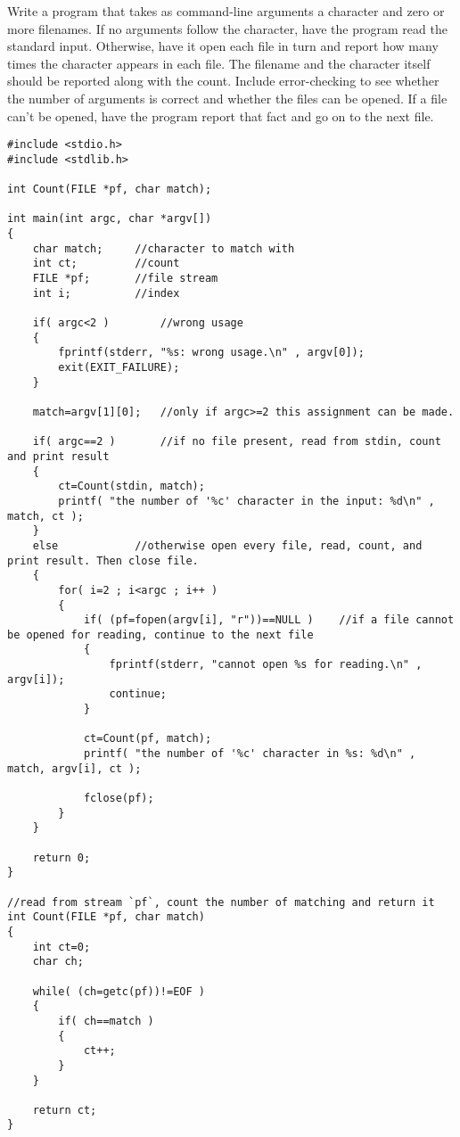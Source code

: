 \begin{question}
  Write a program that takes as command-line arguments a character and zero or more
  filenames. If no arguments follow the character, have the program read the standard
  input. Otherwise, have it open each file in turn and report how many times the character
  appears in each file. The filename and the character itself should be reported along with
  the count. Include error-checking to see whether the number of arguments is correct and
  whether the files can be opened. If a file can’t be opened, have the program report that
  fact and go on to the next file.
\end{question}
\begin{solution}
  \begin{verbatim}
#include <stdio.h>
#include <stdlib.h>

int Count(FILE *pf, char match);

int main(int argc, char *argv[])
{
	char match;		//character to match with
	int ct;			//count
	FILE *pf;		//file stream
	int i;			//index

	if( argc<2 )		//wrong usage
	{
		fprintf(stderr, "%s: wrong usage.\n" , argv[0]);
		exit(EXIT_FAILURE);
	}

	match=argv[1][0];	//only if argc>=2 this assignment can be made.

	if( argc==2 )		//if no file present, read from stdin, count and print result
	{
		ct=Count(stdin, match);
		printf( "the number of '%c' character in the input: %d\n" , match, ct );
	}
	else			//otherwise open every file, read, count, and print result. Then close file.
	{
		for( i=2 ; i<argc ; i++ )
		{
			if( (pf=fopen(argv[i], "r"))==NULL )	//if a file cannot be opened for reading, continue to the next file
			{
				fprintf(stderr, "cannot open %s for reading.\n" , argv[i]);
				continue;
			}

			ct=Count(pf, match);
			printf( "the number of '%c' character in %s: %d\n" , match, argv[i], ct );

			fclose(pf);
		}
	}

	return 0;
}

//read from stream `pf`, count the number of matching and return it
int Count(FILE *pf, char match)
{
	int ct=0;
	char ch;

	while( (ch=getc(pf))!=EOF )
	{
		if( ch==match )
		{
			ct++;
		}
	}

	return ct;
}
  \end{verbatim}
\end{solution}

